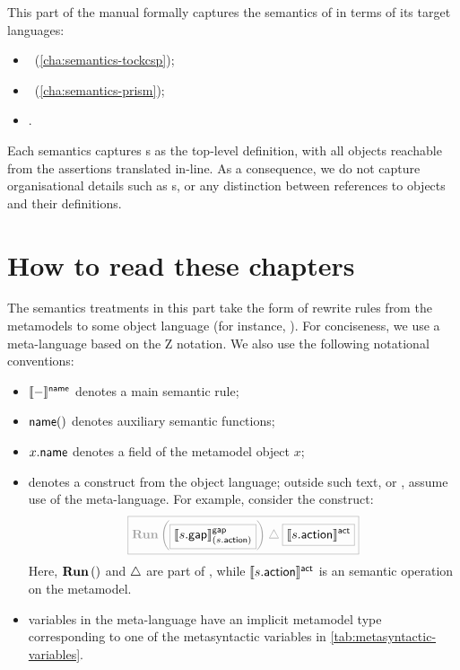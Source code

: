 
This part of the manual formally captures the semantics of \langname{} in terms
of its target languages:

\begin{itemize}
\item
	\tockcsp~(\cref{cha:semantics-tockcsp});
\item
	~(\cref{cha:semantics-prism});
\item
	.
\end{itemize}

Each semantics captures \massertion s as the top-level definition, with all
objects reachable from the assertions translated in-line.  As a
consequence, we do not capture organisational details such as \mrapackage s,
or any distinction between references to objects and their definitions.

\section{How to read these chapters}



The semantics treatments in this part take the form of rewrite rules from
the \langname{} metamodels to some object language (for
instance, \tockcsp).
For conciseness, we use a meta-language based on the Z notation.
We also use the following notational conventions:

\begin{itemize}
\item
	\(\llbracket - \rrbracket^{\mathsf{name}}\) denotes a main semantic rule;
\item
	\(\mathsf{name}()\) denotes auxiliary semantic functions;
\item
	\(x.\mathsf{name}\) denotes a field of the metamodel object \(x\);
\item
	 denotes a construct from the object
	language; outside such text, or ,
	assume use of the meta-language.  For example, consider the \tockcsp{}
	construct:
	\[\tlang{
		\runproc{\olang{\gapsema{\field{\astep}{gap}}{\field{\astep}{action}}}}
		\interrupt \olang{\actsema{\field{\astep}{action}}}
	}\]
	Here, \(\operatorname{\mathbf{Run}}\left(\right)\) and \(\mathbin{\triangle}\) are part of \tockcsp, while
	\(\llbracket s.\mathsf{action} \rrbracket^{\mathsf{act}}\) is an semantic operation on the
	\langname{} metamodel.
\item
	variables in the meta-language have an implicit metamodel type
	corresponding to one of the metasyntactic variables in
	\cref{tab:metasyntactic-variables}.
\end{itemize}

